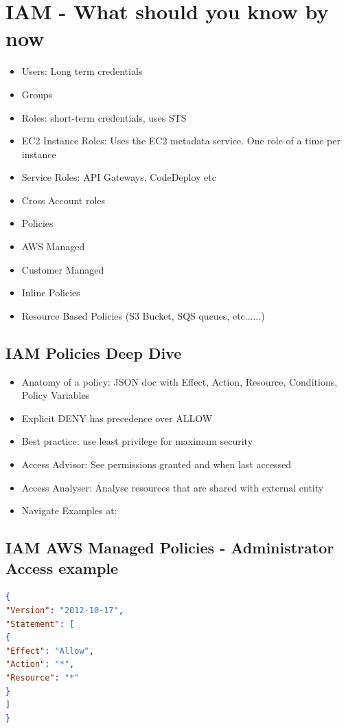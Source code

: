 \section{IAM - What should you know by now}
\begin{itemize}
    \item Users: Long term credentials
    \item Groups
    \item Roles: short-term credentials, uses STS
    \item EC2 Instance Roles: Uses the EC2 metadata service. One role of a time per instance
    \item Service Roles: API Gateways, CodeDeploy etc
    \item Cross Account roles
    \item Policies
    \item AWS Managed
    \item Customer Managed
    \item Inline Policies
    \item Resource Based Policies (S3 Bucket, SQS queues, etc......)
\end{itemize}

\subsection{IAM Policies Deep Dive}
\begin{itemize}
    \item Anatomy of a policy: JSON doc with Effect, Action, Resource, Conditions, Policy Variables
    \item Explicit DENY has precedence over ALLOW
    \item Best practice: use least privilege for maximum security
    \item Access Advisor: See permissions granted and when last accessed
    \item Access Analyser: Analyse resources that are shared with external entity
    \item Navigate Examples at: %
\end{itemize}

\subsection{IAM AWS Managed Policies - Administrator Access example}

\begin{lstlisting}[language=JSON, caption=Sample JSON Data, label=lst:json-example]
{
"Version": "2012-10-17",
"Statement": [
{
"Effect": "Allow",
"Action": "*",
"Resource": "*"
}
]
}
\end{lstlisting}

